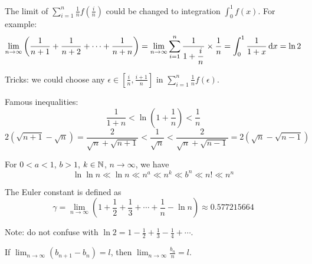 \begin{example}
    The limit of $\displaystyle \sum_{i=1}^n \frac{1}{n}f\left(\frac{i}{n}\right)$ could be changed to integration $\displaystyle \int_{0}^1 f(x)$. For example:
    \begin{equation}
        \lim_{n \rightarrow \infty} \left( \frac{1}{n+1} + \frac{1}{n+2} + \cdots + \frac{1}{n+n} \right) = \lim_{n \rightarrow \infty} \sum_{i=1}^n \frac{1}{\displaystyle 1+\frac{i}{n}} \times \frac{1}{n} = \int_0^1 \frac{1}{1+x} \dif x = \ln 2
    \end{equation}
    
    Tricks: we could choose any $\epsilon \in \left[\frac{i}{n}, \frac{i+1}{n}\right]$ in $\displaystyle \sum_{i=1}^n \frac{1}{n}f(\epsilon)$.
\end{example}


\begin{example}
    Famous inequalities:
    \begin{equation}
        \frac{1}{1+n} < \ln \left(1+\frac{1}{n} \right) < \frac{1}{n}
    \end{equation}
    \begin{equation}
        2(\sqrt{n+1} - \sqrt{n}) = \frac{2}{\sqrt{n} + \sqrt{n+1}} < \frac{1}{\sqrt{n}} < \frac{2}{\sqrt{n} + \sqrt{n-1}} = 2(\sqrt{n} - \sqrt{n-1} )
    \end{equation}
\end{example}

\begin{example}
    For $0 < a < 1$, $b > 1$, $k \in \mathbb{N}$, $n \rightarrow \infty$, we have
    \begin{equation}
        \ln \ln n \ll \ln n \ll n^a \ll n^k \ll b^n \ll n! \ll n^n
    \end{equation}
\end{example}

\begin{theorem}
    The Euler constant is defined as
    \begin{equation}
        \gamma = \lim_{n \rightarrow \infty} \left(1 + \frac{1}{2} + \frac{1}{3} + \cdots + \frac{1}{n} - \ln n \right) \approx 0.577215664
    \end{equation}
    
    Note: do not confuse with $\ln 2 = 1 - \frac{1}{2} + \frac{1}{3} - \frac{1}{4} + \cdots$.
\end{theorem}

\begin{theorem}
    If $\displaystyle \lim_{n \rightarrow \infty}(b_{n+1} - b_n) = l$, then $\displaystyle \lim_{n\rightarrow \infty} \frac{b_n}{n} = l$.
\end{theorem}


